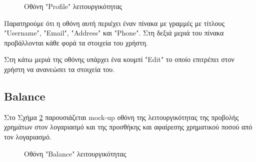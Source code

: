 \documentclass[12pt,a4paper]{article}
\begin{document}
\begin{figure}[H]
	\caption{Οθόνη "Profile" λειτουργικότητας}
	\label{Οθόνη "Profile" λειτουργικότητας}
\end{figure}

Παρατηρούμε ότι η οθόνη αυτή περιέχει έναν πίνακα με γραμμές με τίτλους "Username", "Email", "Address" και "Phone". Στη δεξιά μεριά του πίνακα προβάλλονται κάθε φορά τα στοιχεία του χρήστη.

Στη κάτω μεριά της οθόνης υπάρχει ένα κουμπί "Edit" το οποίο επιτρέπει στον χρήστη να ανανεώσει τα στοιχεία του.

\subsection{Balance}

Στο Σχήμα \ref{Οθόνη "Balance" λειτουργικότητας} παρουσιάζεται mock-up οθόνη της λειτουργικότητας της προβολής χρημάτων στον λογαριασμό και της προσθήκης και αφαίρεσης χρηματικού ποσού από τον λογαριασμό.

\begin{figure}[H]
	\caption{Οθόνη "Balance" λειτουργικότητας}
	\label{Οθόνη "Balance" λειτουργικότητας}
\end{figure}
\end{document}
